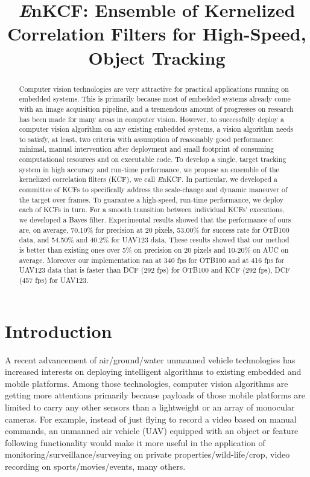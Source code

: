 \documentclass{bmvc2k}
\title{ {\it E}nKCF: Ensemble of Kernelized Correlation Filters for
  High-Speed, Object Tracking}
\begin{document}
\maketitle

\begin{abstract}
Computer vision technologies are very attractive for practical
applications running on embedded systems. This is primarily because
most of embedded systems already come with an image acquisition
pipeline, and a tremendous amount of progresses on research has been
made for many areas in computer vision. However, to successfully
deploy a computer vision algorithm on any existing embedded systems, a
vision algorithm needs to satisfy, at least, two criteria with
assumption of reasonably good performance: minimal, manual
intervention after deployment and small footprint of consuming
computational resources and on executable code. To develop a single,
target tracking system in high accuracy and run-time performance, we
propose an ensemble of the kernelized correlation filters (KCF), we
call {\it E}nKCF. In particular, we developed a committee of KCFs to
specifically address the scale-change and dynamic maneuver of the
target over frames. To guarantee a high-speed, run-time performance, we
deploy each of KCFs in turn. For a smooth transition between
individual KCFs' executions, we developed a Bayes filter. Experimental
results showed that the performance of ours are, on average, 70.10\%
for precision at 20 pixels, 53.00\% for success rate for OTB100 data,
and 54.50\% and 40.2\% for UAV123 data. These results showed that our
method is better than existing ones over 5\% on precision on 20 pixels
and 10-20\% on AUC on average. Moreover our implementation ran at 340
fps for OTB100 and at 416 fps for UAV123 data that is faster than DCF
(292 fps) for OTB100 and KCF (292 fps), DCF (457 fps) for UAV123.
\end{abstract}

\section{Introduction}
A recent advancement of air/ground/water unmanned vehicle technologies
has increased interests on deploying intelligent algorithms to
existing embedded and mobile platforms. Among those technologies,
computer vision algorithms are getting more attentions primarily
because payloads of those mobile platforms are limited to carry any
other sensors than a lightweight or an array of monocular cameras. For
example, instead of just flying to record a video based on manual
commands, an unmanned air vehicle (UAV) equipped with an object or
feature following functionality would make it more useful in the
application of monitoring/surveillance/surveying on private
properties/wild-life/crop, video recording on sports/movies/events,
many others.
\end{document}
